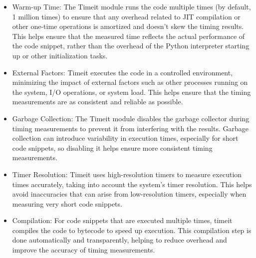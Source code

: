 \begin{itemize}
    \item Warm-up Time: The Timeit module runs the code multiple times (by default, 1 million times) to ensure that any overhead related to JIT compilation or other one-time operations is amortized and doesn't skew the timing results.
    This helps ensure that the measured time reflects the actual performance of the code snippet, rather than the overhead of the Python interpreter starting up or other initialization tasks.

    \item External Factors: Timeit executes the code in a controlled environment, minimizing the impact of external factors such as other processes running on the system, I/O operations, or system load. This helps ensure that the timing measurements are as consistent and reliable as possible.

    \item Garbage Collection: The Timeit module disables the garbage collector during timing measurements to prevent it from interfering with the results. Garbage collection can introduce variability in execution times, especially for short code snippets, so disabling it helps ensure more consistent timing measurements.

    \item Timer Resolution: Timeit uses high-resolution timers to measure execution times accurately, taking into account the system's timer resolution. This helps avoid inaccuracies that can arise from low-resolution timers, especially when measuring very short code snippets.

    \item Compilation: For code snippets that are executed multiple times, timeit compiles the code to bytecode to speed up execution. This compilation step is done automatically and transparently, helping to reduce overhead and improve the accuracy of timing measurements.
\end{itemize}

